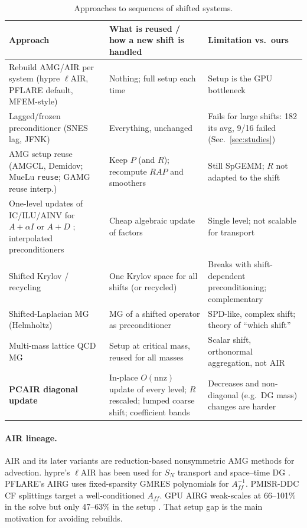 \documentclass[11pt,a4paper]{article}
\newcommand{\Aff}{A_{ff}}
\begin{document}
\begin{table}[h]\centering\small
\begin{tabularx}{\textwidth}{>{\raggedright}p{4.3cm}X>{\raggedright\arraybackslash}p{3.2cm}}
\toprule
Approach & What is reused / how a new shift is handled & Limitation vs.\ ours\\\midrule
Rebuild AMG/AIR per system (hypre $\ell$AIR, PFLARE default, MFEM-style) \cite{MRS18,MMRS19,Darg24} & Nothing; full setup each time & Setup is the GPU bottleneck \cite{Darg26,LSY21}\\
Lagged/frozen preconditioner (SNES lag, JFNK) \cite{KnollKeyes04} & Everything, unchanged & Fails for large shifts: 182 its avg, 9/16 failed (Sec.~\ref{sec:studies})\\
AMG setup reuse (AMGCL, Demidov; MueLu \texttt{reuse}; GAMG reuse interp.) \cite{Demidov21,AMGCL19,MueLuReuse} & Keep $P$ (and $R$); recompute $RAP$ and smoothers & Still SpGEMM; $R$ not adapted to the shift\\
One-level updates of IC/ILU/AINV for $A+\alpha I$ or $A+D$ \cite{Meurant01,BenziBert03,Bert04,DTT07,BBM11}; interpolated preconditioners \cite{BertDur16} & Cheap algebraic update of factors & Single level; not scalable for transport\\
Shifted Krylov / recycling \cite{FG98,Simoncini03,BvG15,PdS06,SSX14,Sood16} & One Krylov space for all shifts (or recycled) & Breaks with shift-dependent preconditioning; complementary\\
Shifted-Laplacian MG (Helmholtz) \cite{EVO04,EOV06,GGS15,CG17} & MG of a shifted operator as preconditioner & SPD-like, complex shift; theory of ``which shift''\\
Multi-mass lattice QCD MG \cite{Babich10,FKKLR14,ABF18} & Setup at critical mass, reused for all masses & Scalar shift, orthonormal aggregation, not AIR\\
\textbf{PCAIR diagonal update} & In-place $O(\mathrm{nnz})$ update of every level; $R$ rescaled; lumped coarse shift; coefficient bands & Decreases and non-diagonal (e.g.\ DG mass) changes are harder\\
\bottomrule
\end{tabularx}
\caption{Approaches to sequences of shifted systems.}\label{tab:lit}
\end{table}

\paragraph{AIR lineage.} AIR \cite{MRS18,MMRS19} and its later variants \cite{Ali24} are reduction-based nonsymmetric AMG methods for advection. hypre's $\ell$AIR has been used for $S_N$ transport \cite{Hanophy20} and space--time DG \cite{SSR21}. PFLARE's AIRG \cite{Darg24} uses fixed-sparsity GMRES polynomials for $\Aff^{-1}$. PMISR-DDC CF splittings target a well-conditioned $\Aff$. GPU AIRG weak-scales at 66--101\% in the solve but only 47--63\% in the setup \cite{Darg25,Darg26}. That setup gap is the main motivation for avoiding rebuilds.
\end{document}
